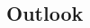 \documentclass[12pt]{article}
\begin{document}
\begin{multicols}{2}

\section{Outlook}


\begin{thebibliography}{3}

	
        
    
\end{thebibliography}

    
\end{multicols}
\end{document}
